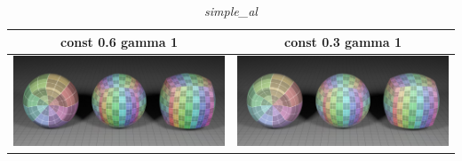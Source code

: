 \documentclass[11pt]{article}
\begin{document}
\begin{table}[ht]
  \centering
  \begin{tabular}{ | c | c | }
    \hline
    const 0.6 gamma 1 & const 0.3 gamma 1 \\ \hline
    \begin{minipage}{.3\textwidth}
      \includegraphics[scale=0.1]{img/obj/simple_al/simple_al_disney_dc03_dg1.jpg}
    \end{minipage}
    &
    \begin{minipage}{.3\textwidth}
      \includegraphics[scale=0.1]{img/obj/simple_al/simple_al_disney_dg1.jpg}
    \end{minipage}
    \\ \hline
  \end{tabular}
  \caption{\textit{simple\_al}}\label{tbl:myLboro}
\end{table}
\end{document}
